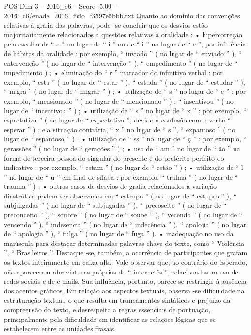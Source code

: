 \begin{textsample}{POS Dim 3 – 2016\_c6 – Score -5.00 – 2016\_c6/enade\_2016\_fisio\_f3597e5bbb.txt}
Quanto ao domínio das convenções relativas à grafia das palavras, pode -se concluir que os desvios estão majoritariamente relacionados a questões relativas à oralidade : • hipercorreção pela escolha de “ e ” no lugar de “ i ” ou de “ i ” no lugar de “ e ”, por influência de hábitos da oralidade : por exemplo, “ inviado ” ( no lugar de “ enviado ” ), “ entervenção ” ( no lugar de “ intervenção ” ), “ empedimento ” ( no lugar de “ impedimento ) ; • eliminação do “ r ” marcador do infinitivo verbal : por exemplo, “ esta ” ( no lugar de “ estar ” ), “ estuda ” ( no lugar de “ estudar ” ), “ migra ” ( no lugar de “ migrar ” ) ; • utilização de “ s ” no lugar de “ c ” : por exemplo, “ mensionado ” ( no lugar de “ mencionado ” ) ; “ insentivou ” ( no lugar de “ incentivou ” ) ; • utilização de “ s ” no lugar de “ x ” : por exemplo, “ espectativa ” ( no lugar de “ expectativa ”, devido à confusão com o verbo “ esperar ” ) ; e a situação contrária, “ x ” no lugar de “ s ”, “ expantoso ” ( no lugar de “ espantoso ” ) ; • utilização de “ ss ” no lugar de “ ç ” : por exemplo, “ gerassões ” ( no lugar de “ gerações ” ) ; • uso de “ am ” no lugar de “ ão ” na forma de terceira pessoa do singular do presente e do pretérito perfeito do indicativo : por exemplo, “ estam ” ( no lugar de “ estão ” ) ; • utilização de “ l ” no lugar de “ u ” em final de sílaba : por exemplo, “ tralma ” ( no lugar de “ trauma ” ) ; • outros casos de desvios de grafia relacionados à variação diastrática podem ser observados em “ estrupo ” ( no lugar de “ estupro ” ), “ subjulgadas ” ( no lugar de “ subjugadas ” ), “ precoseito ” ( no lugar de “ preconceito ” ), “ soubre ” ( no lugar de “ soube ” ), “ vecendo ” ( no lugar de “ vencendo ” ), “ indesencia ” ( no lugar de “ indecência ” ), “ apolojia ” ( no lugar de “ apologia ” ), “ fulga ” ( no lugar de “ fuga ” ). • inadequação no uso da maiúscula para destacar determinadas palavras-chave do texto, como “ Violência ”, “ Brasileiros ”.
Destaque -se, também, a ocorrência de participantes que grafam os textos inteiramente em caixa alta.
Vale observar que, ao contrário do esperado, não apareceram abreviaturas próprias do “ internetês ”, relacionadas ao uso de redes sociais e de e-mails.
Sua influência, portanto, parece se restringir à ausência dos acentos gráficos.
Em relação aos aspectos textuais, observa -se dificuldade na estruturação textual, o que resulta em truncamentos sintáticos e prejuízo da compreensão do texto, e desrespeito a regras essenciais de pontuação, principalmente pela dificuldade em identificar as relações lógicas que se estabelecem entre as unidades frasais.

\end{textsample}
